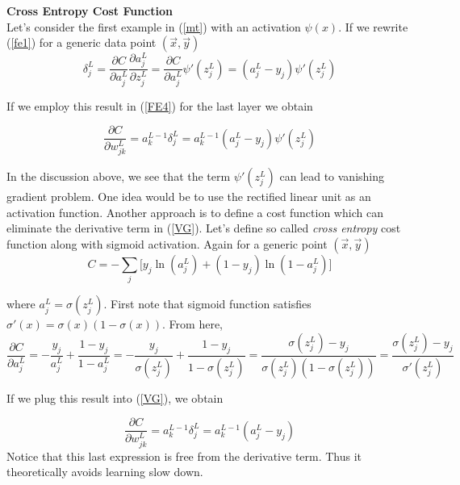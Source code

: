\documentclass[12pt]{article}
\begin{document}
\begin{flushleft}
\textbf{Cross Entropy Cost Function} \\
Let's consider the first example in (\ref{mt}) with an activation $\psi(x)$. If we rewrite (\ref{fe1}) for a generic data point $(\vec{x},\vec{y})$
\begin{equation}
\delta_{j}^{L} = \dfrac{\partial C}{\partial a_{j}^{L}} \dfrac{\partial a_{j}^{L}}{\partial z_{j}^{L}} = \dfrac{\partial C}{\partial a_{j}^{L}} \psi'(z_{j}^{L}) = (a_{j}^{L}-y_{j})\psi'(z_{j}^{L})
\end{equation}

If we employ this result in (\ref{FE4}) for the last layer we obtain

\begin{equation}
\label{VG}
\dfrac{\partial C}{\partial w_{jk}^{L}} =  a_{k}^{L-1} \delta_{j}^{L} = a_{k}^{L-1}(a_{j}^{L}-y_{j})\psi'(z_{j}^{L})
\end{equation}

In the discussion above, we see that the term $\psi'(z_{j}^{L})$ can lead to vanishing gradient problem. One idea would be to use the rectified linear unit as an activation function. Another approach is to define a cost function which can eliminate the derivative term in (\ref{VG}). Let's define so called \textit{cross entropy} cost function
along with sigmoid activation. Again for a generic point $(\vec{x},\vec{y})$
\begin{equation}
\label{CE}
C = -\sum_{j} \Big[ y_{j}\ln(a_{j}^{L})+(1-y_{j})\ln(1-a_{j}^{L}) \Big] 
\end{equation} 

where $a_{j}^{L} = \sigma(z_{j}^{L})$. First note that sigmoid function satisfies $\sigma'(x)=\sigma(x)(1-\sigma(x))$. From here, $$ \dfrac{\partial C}{\partial a_{j}^{L}} = -\dfrac{y_{j}}{a_{j}^{L}} + \dfrac{1-y_{j}}{1-a_{j}^{L}} = -\dfrac{y_{j}}{\sigma(z_{j}^{L})} + \dfrac{1-y_{j}}{1-\sigma(z_{j}^{L})} = \dfrac{\sigma(z_{j}^{L})-y_{j}}{ \sigma(z_{j}^{L})(1-\sigma(z_{j}^{L}))} = \dfrac{\sigma(z_{j}^{L})-y_{j}}{ \sigma'(z_{j}^{L}) }$$

If we plug this result into (\ref{VG}), we obtain 

\begin{equation}
\label{eq:ce}
\dfrac{\partial C}{\partial w_{jk}^{L}} =  a_{k}^{L-1} \delta_{j}^{L} = a_{k}^{L-1}(a_{j}^{L}-y_{j})
\end{equation}
Notice that this last expression is free from the derivative term. Thus it theoretically avoids learning slow down.
\end{flushleft}
\end{document}
